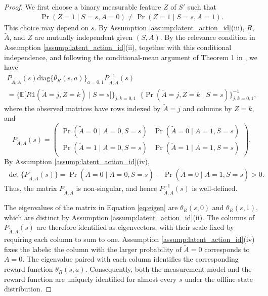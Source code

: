\documentclass[12pt]{article}
\newcommand{\diag}{{\mbox{diag}}}
\newcommand{\0}{\boldsymbol{0}}
\newcommand{\E}{\mathbb{E}}
\begin{document}
\begin{proof}
We first choose a binary measurable feature $Z$ of $S'$ such that
\begin{gather*}
    \Pr(Z=1\mid S=s,A=0)\ne\Pr(Z=1\mid S=s,A=1).
\end{gather*}
This choice may depend on $s$. By Assumption \ref{assump:latent_action_id}(iii), $R$, $\widetilde A$, and $Z$ are mutually independent given $(S,A)$. By the relevance condition in Assumption \ref{assump:latent_action_id}(ii), together with this conditional independence,  and following the conditional-mean argument of Theorem 1 in \citet{zhou2024causal}, we have
\begin{gather} \label{eq:eigen}
   \nonumber P_{\widetilde A,A}(s)
    \diag\bigl\{\theta_R(s,a)\bigr\}_{a=0,1}
    P_{\widetilde A,A}^{-1}(s)\\
    =\bigl\{\E\big[R\mathds{1}(\widetilde A=j,Z=k)\mid S=s\big]\bigr\}_{j,k=0,1} \;\;\bigl\{\Pr(\widetilde A=j,Z=k\mid S=s)\bigr\}_{j,k=0,1}^{-1},
\end{gather}
where the observed matrices have rows indexed by $\widetilde A=j$ and columns by $Z=k$, and
\begin{equation*}
   P_{\widetilde A,A}(s)= \begin{pmatrix}
        \Pr(\widetilde A=0\mid A=0, S=s) & \Pr(\widetilde A=0\mid A=1, S=s)\\
         \Pr(\widetilde A=1\mid A=0, S=s) & \Pr(\widetilde A=1\mid A=1, S=s)
    \end{pmatrix}.
\end{equation*} By Assumption \ref{assump:latent_action_id}(iv),
\begin{gather*}
    \det\{P_{\widetilde A,A}(s)\}
    =\Pr(\widetilde A=0\mid A=0,S=s)-\Pr(\widetilde A=0\mid A=1,S=s)>0.
\end{gather*}
Thus, the matrix $P_{\widetilde A,A}$ is non-singular, and hence $P_{\widetilde A,A}^{-1}(s)$ is well-defined.

The eigenvalues of the matrix in Equation \eqref{eq:eigen} are $\theta_R(s,0)$ and $\theta_R(s,1)$, which are distinct by Assumption \ref{assump:latent_action_id}(ii). The columns of $P_{\widetilde A,A}(s)$ are therefore identified as eigenvectors, with their scale fixed by requiring each column to sum to one. Assumption \ref{assump:latent_action_id}(iv) fixes the labels: the column with the larger probability of $\widetilde A=0$ corresponds to $A=0$. The eigenvalue paired with each column identifies the corresponding reward function $\theta_R(s,a)$. Consequently, both the measurement model and the reward function are uniquely identified for almost every $s$ under the offline state distribution.


\end{proof}
\end{document}
